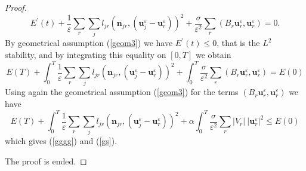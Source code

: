 \documentclass[a4paper,french,english,10pt]{article}
\newcommand\njr{\mathbf{n}_{jr}}
\newcommand\uu{\mathbf{u}}
\newcommand\eps{\varepsilon}
\newcommand\uj{\uu_j}
\newcommand\ur{\uu_r}
\begin{document}
\begin{proof}
\begin{equation}
\displaystyle
E^{'}(t)+\frac{1}{\varepsilon}\sum_{r}\sum_{j}l_{jr}(\njr,(\uu^{\eps}
_{j}-\ur^{\eps}))^{2}+ \frac{\sigma}{\varepsilon^{2}}
\sum_{r}(B_r\ur^{\eps},\ur^{\eps})= 0.
\end{equation}
By geometrical assumption  (\ref{geom3}) we have $E^{'}(t)\leq 0$, that is the
$L^2$ stability, and
by integrating this equality on $[0,T]$ we obtain
\begin{equation*}\label{eq:ds5}
\displaystyle
E(T)+\int_0^T\frac{1}{\varepsilon}\sum_{r}\sum_{j}l_{jr}(\njr,
(\uj^{\eps}-\ur^{\eps}))^{2}+ \int_0^T\frac{\sigma}{\varepsilon^{2}}
\sum_{r}(B_r\ur^{\eps},\ur^{\eps})=E(0)
\end{equation*}
Using again the geometrical assumption  (\ref{geom3}) for the terms
$(B_r\ur^{\eps},\ur^{\eps})$ we have
\begin{equation*}\label{eq:ds6}
\displaystyle
E(T)+\int_{0}^T\frac{1}{\varepsilon}\sum_{r}\sum_{j}l_{jr}(\njr,
(\uj^{\eps}-\ur^{\eps}))^{2}+ \alpha
\int_{0}^T\frac{\sigma}{\varepsilon^{2}} \sum_{r}\vert V_r\vert
\ \vert\ur^{\eps}\vert^2\leq E(0)
\end{equation*}
which gives (\ref{gggg}) and (\ref{gs}).

The proof is ended.
\end{proof}
\end{document}
